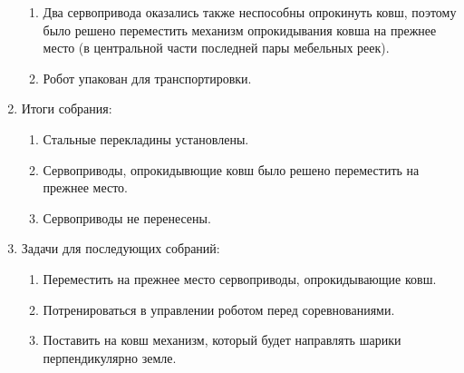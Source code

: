 \begin{enumerate}
\begin{enumerate}
		\item Два сервопривода оказались также неспособны опрокинуть ковш, поэтому было решено переместить механизм опрокидывания ковша на прежнее место (в центральной части последней пары мебельных реек).
		
		\item Робот упакован для транспортировки.
		
	\end{enumerate}
	\item Итоги собрания:
	\begin{enumerate}
		\item Стальные перекладины установлены.
		
		\item Сервоприводы, опрокидывющие ковш было решено переместить на прежнее место.
		
		\item Сервоприводы не перенесены.
		
	\end{enumerate}
	\item Задачи для последующих собраний:
	\begin{enumerate}	
		\item Переместить на прежнее место сервоприводы, опрокидывающие ковш.
		
		\item Потренироваться в управлении роботом перед соревнованиями.
		
		\item Поставить на ковш механизм, который будет направлять шарики перпендикулярно земле.
		
	\end{enumerate}
\end{enumerate}
\fillpage